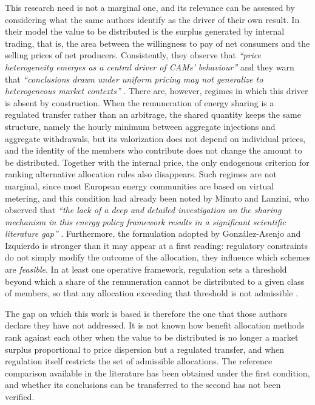 This research need is not a marginal one, and its relevance can be assessed by considering what the same authors identify as the driver of their own result. In their model the value to be distributed is the surplus generated by internal trading, that is, the area between the willingness to pay of net consumers and the selling prices of net producers. Consistently, they observe that \textit{``price heterogeneity emerges as a central driver of CAMs' behaviour''} and they warn that \textit{``conclusions drawn under uniform pricing may not generalize to heterogeneous market contexts''} \cite{gonzalezAsenjo2026}. There are, however, regimes in which this driver is absent by construction. When the remuneration of energy sharing is a regulated transfer rather than an arbitrage, the shared quantity keeps the same structure, namely the hourly minimum between aggregate injections and aggregate withdrawals, but its valorization does not depend on individual prices, and the identity of the members who contribute does not change the amount to be distributed. Together with the internal price, the only endogenous criterion for ranking alternative allocation rules also disappears. Such regimes are not marginal, since most European energy communities are based on virtual metering, and this condition had already been noted by Minuto and Lanzini, who observed that \textit{``the lack of a deep and detailed investigation on the sharing mechanism in this energy policy framework results in a significant scientific literature gap''} \cite{minutoLanzini2022}. Furthermore, the formulation adopted by González-Asenjo and Izquierdo is stronger than it may appear at a first reading: regulatory constraints do not simply modify the outcome of the allocation, they influence which schemes are \emph{feasible}. In at least one operative framework, regulation sets a threshold beyond which a share of the remuneration cannot be distributed to a given class of members, so that any allocation exceeding that threshold is not admissible \cite{MASE:Decreto:CER:2023}.

The gap on which this work is based is therefore the one that those authors declare they have not addressed. It is not known how benefit allocation methods rank against each other when the value to be distributed is no longer a market surplus proportional to price dispersion but a regulated transfer, and when regulation itself restricts the set of admissible allocations. The reference comparison available in the literature has been obtained under the first condition, and whether its conclusions can be transferred to the second has not been verified.

